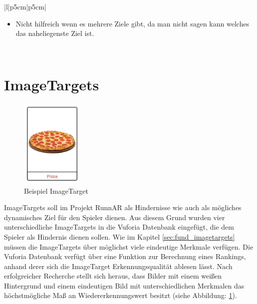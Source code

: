 \begin{table}[H]
{\begin{tabular}{|l|p{5cm}|p{5cm}|}
          \begin{minipage}{\linewidth}
            \vspace{0.1cm}
            \begin{itemize}
                \item Nicht hilfreich wenn es mehrere Ziele gibt, da man nicht sagen kann welches das naheliegenste Ziel ist.
            \end{itemize}
            \vspace{0.1cm}
        \end{minipage}                    \\ \hline
        \end{tabular}%
    }
    \caption{Vergleich A* und Dijkstra }
    \label{tbl:comparisonA*Dijkstra}
\end{table}

\section{ImageTargets}
\label{sec:rec_imageTargets}
\begin{figure}
	\includegraphics[width=3cm]{assets/exampleImageTarget.jpg}
	\caption{Beispiel ImageTarget}
	\label{fig:exampleImageTarget}
\end{figure}
ImageTargets soll im Projekt RunnAR als Hindernisse wie auch als mögliches dynamisches Ziel für den Spieler dienen. Aus diesem Grund wurden vier unterschiedliche ImageTargets in die Vuforia Datenbank eingefügt, die dem Spieler als Hindernis dienen sollen. Wie im Kapitel \ref{sec:fund_imagetargets}  müssen die ImageTargets über möglichst viele eindeutige Merkmale verfügen. Die Vuforia Datenbank verfügt über eine Funktion zur Berechnung eines Rankings, anhand derer sich die ImageTarget Erkennungsqualität ablesen lässt. Nach erfolgreicher Recherche stellt sich heraus, dass Bilder mit einem weißen Hintergrund und einem eindeutigen Bild mit unterschiedlichen Merkmalen das höchstmögliche Maß an Wiedererkennungswert besitzt (siehe Abbildung: \ref{fig:exampleImageTarget}).

